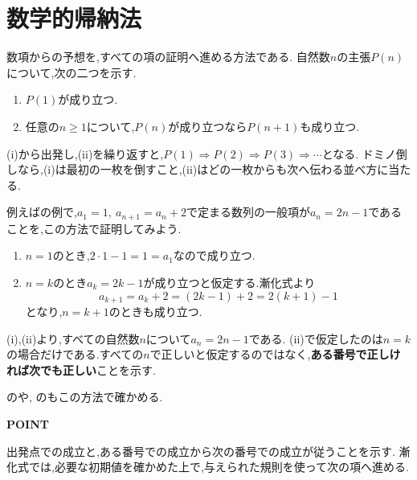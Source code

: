 
\section{数学的帰納法}\label{節：数学的帰納法}
数項からの予想を,すべての項の証明へ進める方法である.
自然数$n$の主張$P(n)$について,次の二つを示す.
\begin{enumerate}[label=(\roman*),parsep=3pt]
  \item $P(1)$が成り立つ.
  \item 任意の$n\ge1$について,$P(n)$が成り立つなら$P(n+1)$も成り立つ.
\end{enumerate}
(i)から出発し,(ii)を繰り返すと,$P(1)\Rightarrow P(2)\Rightarrow P(3)\Rightarrow\cdots$となる.
ドミノ倒しなら,(i)は最初の一枚を倒すこと,(ii)はどの一枚からも次へ伝わる並べ方に当たる.

例えばの例で,$a_1=1,\ a_{n+1}=a_n+2$で定まる数列の一般項が$a_n=2n-1$であることを,この方法で証明してみよう.
\begin{enumerate}[label=(\roman*),parsep=3pt]
  \item $n=1$のとき,$2\cdot1-1=1=a_1$なので成り立つ.
  \item $n=k$のとき$a_k=2k-1$が成り立つと仮定する.漸化式より
    \[
      a_{k+1}=a_k+2=(2k-1)+2=2(k+1)-1
    \]
    となり,$n=k+1$のときも成り立つ.
\end{enumerate}
(i),(ii)より,すべての自然数$n$について$a_n=2n-1$である.
(ii)で仮定したのは$n=k$の場合だけである.すべての$n$で正しいと仮定するのではなく,\textbf{ある番号で正しければ次でも正しい}ことを示す.

のや,
のもこの方法で確かめる.

\begin{bookpoint}
  \textbf{POINT}\par
  出発点での成立と,ある番号での成立から次の番号での成立が従うことを示す.
  漸化式では,必要な初期値を確かめた上で,与えられた規則を使って次の項へ進める.
\end{bookpoint}
